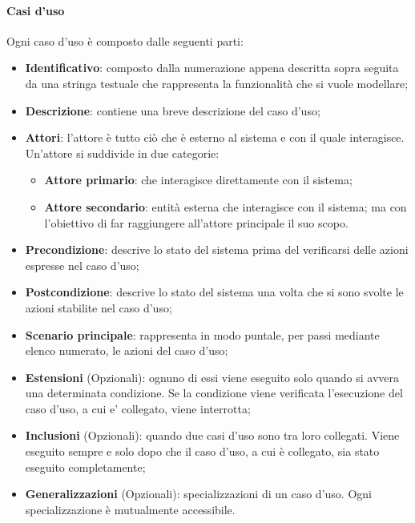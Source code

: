 \paragraph{Casi d'uso}\mbox{}
\label{Casi d'uso}
\noindent
Ogni caso d'uso è composto dalle seguenti parti:
      \begin{itemize}
      \item \textbf{Identificativo}: composto dalla numerazione appena descritta sopra seguita da una stringa testuale che rappresenta la funzionalità che si vuole modellare;
      \item \textbf{Descrizione}: contiene una breve descrizione del caso d'uso;
      \item \textbf{Attori}: l'attore è  tutto ciò che è esterno al sistema e con il quale interagisce. Un'attore si suddivide in due categorie:
        \begin{itemize}
        \item \textbf{Attore primario}: che interagisce direttamente con il sistema;
        \item \textbf{Attore secondario}: entità esterna che interagisce con il sistema; ma con l'obiettivo di far raggiungere all'attore principale il suo scopo.
        \end{itemize}
      \item \textbf{Precondizione}: descrive lo stato del sistema prima del verificarsi delle azioni espresse nel caso d'uso;
      \item \textbf{Postcondizione}: descrive lo stato del sistema una volta che si sono svolte le azioni stabilite nel caso d'uso;
      \item \textbf{Scenario principale}: rappresenta in modo puntale, per passi mediante elenco numerato, le azioni del caso d'uso;
      \item \textbf{Estensioni} (Opzionali): ognuno di essi viene eseguito solo quando si avvera una determinata condizione. Se la condizione viene verificata l'esecuzione del caso d'uso, a cui e' collegato, viene interrotta;
      \item \textbf{Inclusioni} (Opzionali): quando due casi d'uso sono tra loro collegati. Viene eseguito sempre e solo dopo che il caso d'uso, a cui è collegato, sia stato eseguito completamente;
      \item \textbf{Generalizzazioni} (Opzionali): specializzazioni di un caso d'uso. Ogni specializzazione è mutualmente accessibile.
      \end{itemize}
      
